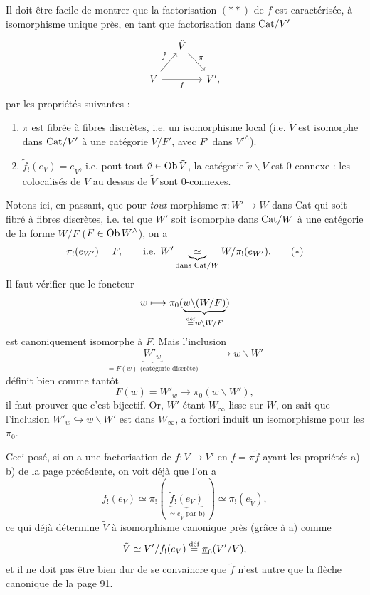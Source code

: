 Il doit être facile de montrer que la factorisation $(**)$ de $f$ est caractérisée, à isomorphisme unique près, en tant que
factorisation dans $\Cat/V'$
\[
\begin{tikzcd}[column sep=small]
 & \tilde{V} \arrow[dr, "\pi"] & \\
V \arrow[ur, "\tilde{f}"] \arrow[rr, "f"'] & & V',
\end{tikzcd}
\]
par les propriétés suivantes :
\begin{enumerate}[label={}, leftmargin=*]
\item[a)] $\pi$ est fibrée à fibres discrètes, i.e. un isomorphisme local (i.e. $\tilde{V}$ est isomorphe dans $\Cat/V'$ à une catégorie $V/F'$, avec $F'$ dans $V'^{\wedge}$). %
\item[b)] $\tilde{f}_!(e_V) = e_{\tilde{V}}$, i.e. pout tout $\tilde{v} \in \Ob \tilde{V}$, la catégorie $\tilde{v}\backslash V$ est 0-connexe : les colocalisés de $V$ au dessus de $\tilde{V}$ sont 0-connexes. %
\end{enumerate}

Notons ici, en passant, que pour \textit{tout} morphisme $\pi : W' \longrightarrow W$ dans Cat qui soit fibré à fibres discrètes, i.e. tel que $W'$ soit isomorphe dans $\Cat/W$ à une catégorie de la forme $W/F$ ($F \in \Ob W^{\wedge}$), on a
\[ \pi_!(e_{W'}) = F, \qquad \text{i.e. } W' \underbrace{\ \simeq\ }_{\text{dans } \Cat/W} W/\pi_!(e_{W'}). \tag*{$(*)$} \]
Il faut vérifier que le foncteur
\[ w \longmapsto \pi_0(\underbrace{w\backslash(W/F)}_{\defeq w\backslash W/F}) \]
est canoniquement isomorphe à $F$. Mais l'inclusion
\[ \underbrace{W'_w}_{= F(w) \text{ (catégorie discrète)}} \qquad \longrightarrow w\backslash W' \]
définit bien comme tantôt
\[ F(w) = W'_w \longrightarrow \pi_0(w\backslash W'), \]
il faut prouver que c'est bijectif. Or, $W'$ étant $W_\infty$-lisse sur $W$, on sait que l'inclusion $W'_w \hookrightarrow w\backslash W'$ est dans $W_\infty$, a fortiori induit un isomorphisme pour les $\pi_0$.

Ceci posé, si on a une factorisation de $f : V \longrightarrow V'$ en $f = \pi\tilde{f}$ ayant les propriétés a) b) de la page précédente, on voit déjà que l'on a
\[ f_!(e_V) \simeq \pi_!(\, \underbrace{\tilde{f}_!(e_V)}_{\simeq e_{\tilde{V}} \text{ par b)}} \,) \simeq \pi_!(e_{\tilde{V}}), \]
ce qui déjà détermine $\tilde{V}$ à isomorphisme canonique près (grâce à a) comme
\[ \tilde{V} \simeq V'/f_!(e_V) \defeq \upi_0(V'/V), \] %
et il ne doit pas être bien dur de se convaincre que $\tilde{f}$ n'est autre que la flèche canonique de la page 91.

